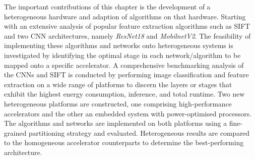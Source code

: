 



The important contributions of this chapter is the development of a heterogeneous hardware and adaption of algorithms on that hardware. Starting with an extensive analysis of popular feature extraction algorithms such as SIFT and two CNN architectures, namely \textit{ResNet18}\cite{SanHowZhu18} and \textit{MobilnetV2}\cite{KaiXSha16}. The feasibility of implementing these algorithms and networks onto heterogeneous systems is investigated by identifying the optimal stage in each network/algorithm to be mapped onto a specific accelerator. A comprehensive benchmarking analysis of the CNNs and SIFT is conducted by performing image classification and feature extraction on a wide range of platforms to discern the layers or stages that exhibit the highest energy consumption, inference, and total runtime. Two new heterogeneous platforms are constructed, one comprising high-performance accelerators and the other an embedded system with power-optimised processors. The algorithms and networks are implemented on both platforms using a fine-grained partitioning strategy and evaluated. Heterogeneous results are compared to the homogeneous accelerator counterparts to determine the best-performing architecture.


